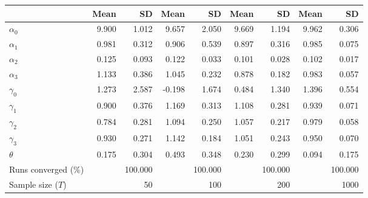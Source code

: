 
\begin{tabular}[t]{lrrrrrrrr}
\toprule
  & Mean & SD & Mean  & SD  & Mean   & SD   & Mean    & SD   \\
\midrule
$\alpha_{0}$ & 9.900 & 1.012 & 9.657 & 2.050 & 9.669 & 1.194 & 9.962 & 0.306\\
$\alpha_{1}$ & 0.981 & 0.312 & 0.906 & 0.539 & 0.897 & 0.316 & 0.985 & 0.075\\
$\alpha_{2}$ & 0.125 & 0.093 & 0.122 & 0.033 & 0.101 & 0.028 & 0.102 & 0.017\\
$\alpha_{3}$ & 1.133 & 0.386 & 1.045 & 0.232 & 0.878 & 0.182 & 0.983 & 0.057\\
$\gamma_{0}$ & 1.273 & 2.587 & -0.198 & 1.674 & 0.484 & 1.340 & 1.396 & 0.554\\
$\gamma_{1}$ & 0.900 & 0.376 & 1.169 & 0.313 & 1.108 & 0.281 & 0.939 & 0.071\\
$\gamma_{2}$ & 0.784 & 0.281 & 1.094 & 0.250 & 1.057 & 0.217 & 0.979 & 0.058\\
$\gamma_{3}$ & 0.930 & 0.271 & 1.142 & 0.184 & 1.051 & 0.243 & 0.950 & 0.070\\
$\theta$ & 0.175 & 0.304 & 0.493 & 0.348 & 0.230 & 0.299 & 0.094 & 0.175\\
Runs converged (\%) &  & 100.000 &  & 100.000 &  & 100.000 &  & 100.000\\
Sample size ($T$) &  & 50 &  & 100 &  & 200 &  & 1000\\
\bottomrule
\end{tabular}
